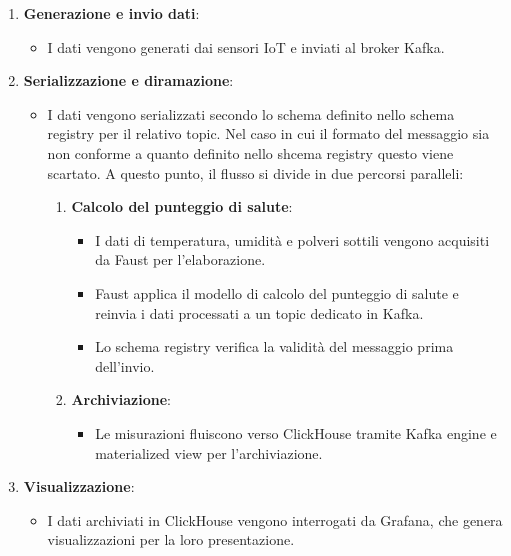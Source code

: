 \begin{enumerate}
    \item \textbf{Generazione e invio dati}:
    \begin{itemize}
        \item I dati vengono generati dai sensori IoT e inviati al broker Kafka.
    \end{itemize}
    
    \item \textbf{Serializzazione e diramazione}:
    \begin{itemize}
        \item I dati vengono serializzati secondo lo schema definito nello schema registry per il relativo topic.
        Nel caso in cui il formato del messaggio sia non conforme a quanto definito nello shcema registry questo viene scartato. A questo punto, il flusso si divide in due percorsi paralleli:
        \begin{enumerate}
            \item \textbf{Calcolo del punteggio di salute}:
            \begin{itemize}
                \item I dati di temperatura, umidità e polveri sottili vengono acquisiti da Faust per l'elaborazione.
                \item Faust applica il modello di calcolo del punteggio di salute e reinvia i dati processati a un topic dedicato in Kafka.
                \item Lo schema registry verifica la validità del messaggio prima dell'invio.
            \end{itemize}
            
            \item \textbf{Archiviazione}:
            \begin{itemize}
                \item Le misurazioni fluiscono verso ClickHouse tramite Kafka engine e materialized view per l'archiviazione.
            \end{itemize}
        \end{enumerate}
    \end{itemize}
    
    \item \textbf{Visualizzazione}:
    \begin{itemize}
        \item I dati archiviati in ClickHouse vengono interrogati da Grafana, che genera visualizzazioni per la loro presentazione.
    \end{itemize}
\end{enumerate}









